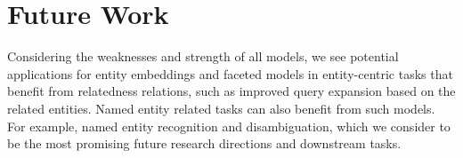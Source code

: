 \section{Future Work}
Considering the weaknesses and strength of all models, we see potential applications for entity embeddings and faceted models in entity-centric tasks that benefit from relatedness relations, such as improved query expansion based on the related entities. Named entity related tasks can also benefit from such models. For example, named entity recognition and disambiguation, which we consider to be the most promising future research directions and downstream tasks.\\